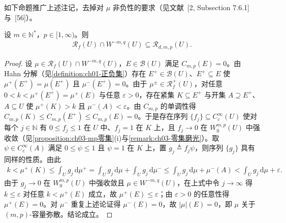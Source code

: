 \documentclass[../../main.tex]{subfiles}%
\begin{document}
如下命题推广上述注记，去掉对 $\mu$ 非负性的要求（见文献~[2, Subsection 7.6.1]与~[56]）。

\begin{proposition}[Gr\"un--Rehomme]\label{proposition:ch03-GrunRehomme}
设 $m\in\mathbb{N}^*$，$p\in[1,\infty)$。则
\begin{align*}
\mathscr{R}_f(U)\cap W^{-m,q}(U)\subseteq\mathscr{R}_{d,m,p}(U).
\end{align*}
\end{proposition}

\begin{proof}
设 $\mu\in\mathscr{R}_f(U)\cap W^{-m,q}(U)$，$E\in\mathcal{B}(U)$ 满足 $C_{m,p}(E)=0$。由 Hahn 分解（见\cref{definition:ch01-正负集}）存在 $E^+\in\mathcal{B}(U)$、$E^+\subseteq E$ 使 $\mu^+(E^+)=\mu(E^+)$ 且 $\mu^-(E^+)=0$。由于 $\mu^\pm\in\mathscr{R}^+_f(U)$，对任意 $0<k<\mu^+(E^+)=\mu^+(E)$ 与任意 $\varepsilon>0$，存在紧集 $K\subseteq E^+$ 与开集 $A\supseteq E^+$、$A\subseteq U$ 使 $\mu^+(K)>k$ 且 $\mu^-(A)<\varepsilon$。由 $C_{m,p}$ 的单调性得 $C_{m,p}(K)\leqslant C_{m,p}(E^+)\leqslant C_{m,p}(E)=0$。于是存在序列 $\{f_j\}\subseteq C^\infty_c(U)$ 使对每个 $j\in\mathbb{N}$ 有 $0\leqslant f_j\leqslant1$ 在 $U$ 中、$f_j=1$ 在 $K$ 上，且 $f_j\to0$ 在 $W^{m,p}_0(U)$ 中强收敛（见\cref{proposition:ch03-mp零集}(i)与\cref{remark:ch03-零集磨光}）。取 $\psi\in C^\infty_c(A)$ 满足 $0\leqslant\psi\leqslant1$ 且 $\psi=1$ 在 $K$ 上，置 $g_j\triangleq f_j\psi$，则序列 $\{g_j\}$ 具有同样的性质。由此
\begin{align*}
k<\mu^+(K)\leqslant\int_U g_j\,\mathrm{d}\mu^+
=\int_U g_j\,\mathrm{d}\mu+\int_U g_j\,\mathrm{d}\mu^-
\leqslant\int_U g_j\,\mathrm{d}\mu+\mu^-(A)<\int_U g_j\,\mathrm{d}\mu+\varepsilon.
\end{align*}
由于 $g_j\to0$ 在 $W^{m,p}_0(U)$ 中强收敛且 $\mu\in W^{-m,q}(U)$，在上式中令 $j\to\infty$ 得 $k\leqslant\varepsilon$ 对任意 $k<\mu^+(E)$ 成立，故 $\mu^+(E)\leqslant\varepsilon$；由 $\varepsilon>0$ 的任意性得 $\mu^+(E)=0$。对 $\mu^-$ 重复上述论证得 $\mu^-(E)=0$，故 $|\mu|(E)=0$，即 $\mu$ 关于 $(m,p)$-容量弥散。结论成立。
\end{proof}
\end{document}
